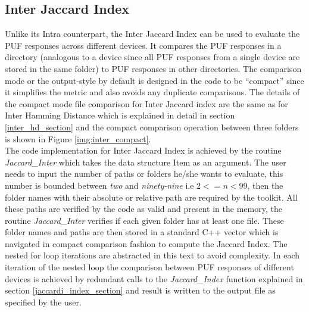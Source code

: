 \subsection{Inter Jaccard Index}
Unlike its Intra counterpart, the Inter Jaccard Index can be used to evaluate the PUF responses across different devices. It compares the PUF responses in a directory (analogous to a device since all PUF responses from a single device are stored in the same folder) to PUF responses in other directories. The comparison mode or the output-style by default is designed in the code to be ``compact'' since it simplifies the metric and also avoids any duplicate comparisons. The details of
the compact mode file comparison for Inter Jaccard index are the same as for Inter Hamming Distance which is explained in detail in section \ref{inter_hd_section} and the  compact comparison operation between three folders is shown in Figure \ref{img:inter_compact}.\\

The code implementation for Inter Jaccard Index is achieved by the routine \emph{Jaccard\_Inter} which takes the data structure Item as an argument. The user needs to input the number of paths or folders he/she wants to evaluate, this number is bounded between \emph{two} and \emph{ninety-nine} i.e $2 <= n < 99$, then the folder names with their absolute or relative path are required by the toolkit. All these paths are verified by the code as valid and present in the memory, the
routine \emph{Jaccard\_Inter} verifies if each given folder has at least one file. These folder names and paths are then stored in a standard C++ vector which is navigated in compact comparison fashion to compute the Jaccard Index. The nested for loop iterations are abstracted in this text to avoid complexity. In each iteration of the nested loop the comparison between PUF responses of different devices is achieved by redundant calls to the \emph{Jaccard\_Index} function explained in section
\ref{jaccardi_index_section} and result is written to the output file as specified by the user.\\

